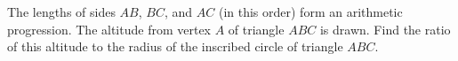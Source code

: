 The lengths of sides $AB$, $BC$, and $AC$ (in this order) form an arithmetic progression. The altitude from vertex $A$ of triangle $ABC$ is drawn. Find the ratio of this altitude to the radius of the inscribed circle of triangle $ABC$.
